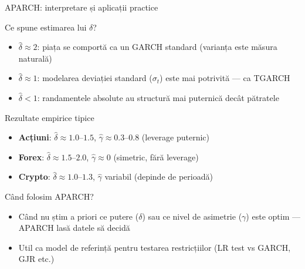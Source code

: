 \documentclass[9pt, aspectratio=169, t]{beamer}
\begin{document}
\begin{frame}{APARCH: interpretare și aplicații practice}
    \small
        \begin{block}{Ce spune estimarea lui $\delta$?}
            \begin{itemize}
                \item $\hat{\delta} \approx 2$: piața se comportă ca un GARCH standard (varianța este măsura naturală)
                \item $\hat{\delta} \approx 1$: modelarea deviației standard ($\sigma_t$) este mai potrivită --- ca TGARCH
                \item $\hat{\delta} < 1$: randamentele absolute au structură mai puternică decât pătratele
            \end{itemize}
        \end{block}
        \begin{exampleblock}{Rezultate empirice tipice}
            \begin{itemize}
                \item \textbf{Acțiuni}: $\hat{\delta} \approx 1.0$--$1.5$, $\hat{\gamma} \approx 0.3$--$0.8$ (leverage puternic)
                \item \textbf{Forex}: $\hat{\delta} \approx 1.5$--$2.0$, $\hat{\gamma} \approx 0$ (simetric, fără leverage)
                \item \textbf{Crypto}: $\hat{\delta} \approx 1.0$--$1.3$, $\hat{\gamma}$ variabil (depinde de perioadă)
            \end{itemize}
        \end{exampleblock}
        \begin{alertblock}{Când folosim APARCH?}
            \begin{itemize}
                \item Când nu știm a priori ce putere ($\delta$) sau ce nivel de asimetrie ($\gamma$) este optim --- APARCH lasă datele să decidă
                \item Util ca model de referință pentru testarea restricțiilor (LR test vs GARCH, GJR etc.)
            \end{itemize}
        \end{alertblock}
\end{frame}
\end{document}
